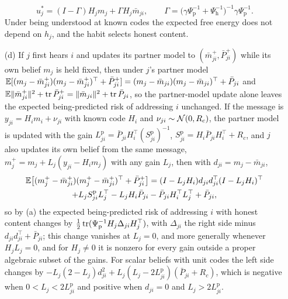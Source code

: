 \begin{proposition}
\begin{enumerate}
\[
u_j^\ast=(I-\Gamma)H_jm_j+\Gamma H_j\bar m_{ji},\qquad\Gamma=\bigl(\gamma\Psi_{\mathrm p}^{-1}+\Psi_{\mathrm h}^{-1}\bigr)^{-1}\gamma\Psi_{\mathrm p}^{-1}.
\]
Under being understood at known codes the expected free energy does not depend on $h_j$, and the habit selects honest content.
\item[(d)] If $j$ first hears $i$ and updates its partner model to $(\bar m^+_{ji},\bar P^+_{ji})$ while its own belief $m_j$ is held fixed, then under $j$'s partner model $\mathbb{E}[(m_j-\bar m^+_{ji})(m_j-\bar m^+_{ji})^\top+\bar P^+_{ji}]=(m_j-\bar m_{ji})(m_j-\bar m_{ji})^\top+\bar P_{ji}$ and $\mathbb{E}\Vert\bar m^+_{ji}\Vert^2+\operatorname{tr}\bar P^+_{ji}=\Vert\bar m_{ji}\Vert^2+\operatorname{tr}\bar P_{ji}$, so the partner-model update alone leaves the expected being-predicted risk of addressing $i$ unchanged. If the message is $y_{ji}=H_im_i+\nu_{ji}$ with known code $H_i$ and $\nu_{ji}\sim\mathcal{N}(0,R_c)$, the partner model is updated with the gain $L^{\mathrm p}_{ji}=\bar P_{ji}H_i^\top(S^{\mathrm p}_{ji})^{-1}$, $S^{\mathrm p}_{ji}=H_i\bar P_{ji}H_i^\top+R_c$, and $j$ also updates its own belief from the same message, $m_j^+=m_j+L_j(y_{ji}-H_im_j)$ with any gain $L_j$, then with $d_{ji}=m_j-\bar m_{ji}$,
\begin{multline*}
\mathbb{E}\bigl[(m^+_j-\bar m^+_{ji})(m^+_j-\bar m^+_{ji})^\top+\bar P^+_{ji}\bigr]=(I-L_jH_i)d_{ji}d_{ji}^\top(I-L_jH_i)^\top\\
+L_jS^{\mathrm p}_{ji}L_j^\top-L_jH_i\bar P_{ji}-\bar P_{ji}H_i^\top L_j^\top+\bar P_{ji},
\end{multline*}
so by (a) the expected being-predicted risk of addressing $i$ with honest content changes by $\tfrac12\operatorname{tr}(\Psi_{\mathrm p}^{-1}H_j\Delta_{ji}H_j^\top)$, with $\Delta_{ji}$ the right side minus $d_{ji}d_{ji}^\top+\bar P_{ji}$; this change vanishes at $L_j=0$, and more generally whenever $H_jL_j=0$, and for $H_j\ne0$ it is nonzero for every gain outside a proper algebraic subset of the gains. For scalar beliefs with unit codes the left side changes by $-L_j(2-L_j)d_{ji}^2+L_j(L_j-2L^{\mathrm p}_{ji})(\bar P_{ji}+R_c)$, which is negative when $0<L_j<2L^{\mathrm p}_{ji}$ and positive when $d_{ji}=0$ and $L_j>2L^{\mathrm p}_{ji}$.
\end{enumerate}
\end{proposition}

